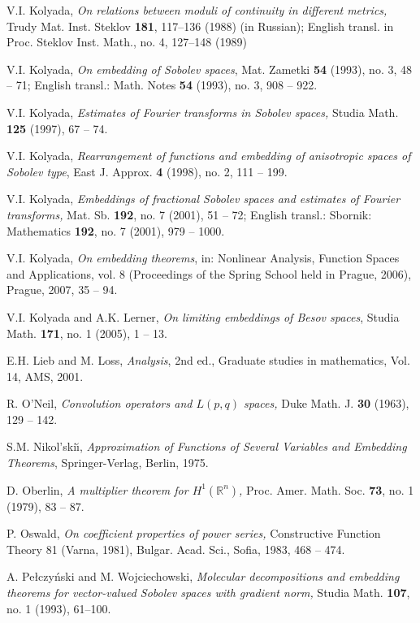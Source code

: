 \documentclass[12pt,twoside,reqno]{amsart}
\numberwithin{equation}{section}
\theoremstyle{definition}
\numberwithin{equation}{section}
\def\R{\mathbb{R}}
\begin{document}
\begin{thebibliography}{99}
  V.I. Kolyada, {\it On relations between moduli of
continuity in different metrics,} Trudy Mat. Inst. Steklov {\bf
181}, 117--136 (1988) (in Russian); English transl. in Proc.
Steklov Inst. Math., no. 4, 127--148 (1989)

 V.I. Kolyada,  {\it On embedding of Sobolev spaces}, Mat. Zametki {\bf 54}
 (1993), no. 3,  48 -- 71; English transl.:  Math. Notes {\bf 54}  (1993), no. 3, 908 --
 922.

  V.I. Kolyada,  {\it Estimates of Fourier
transforms in Sobolev spaces,} Studia Math. {\bf 125} (1997), 67
-- 74.

V.I. Kolyada, {\it Rearrangement of functions and embedding of
anisotropic spaces of Sobolev type}, East J. Approx. {\bf 4}
(1998), no. 2, 111 -- 199.

  V.I. Kolyada, {\it Embeddings of fractional Sobolev spaces and estimates of Fourier transforms,}
 Mat. Sb. {\bf 192}, no. 7 (2001), 51 -- 72; English transl.:  Sbornik:
 Mathematics {\bf 192}, no. 7 (2001), 979 -- 1000.


  V.I. Kolyada, {\it On embedding theorems}, in:
Nonlinear Analysis, Function Spaces and Applications, vol. 8 (Proceedings of the Spring School held in Prague, 2006), Prague, 2007, 35 -- 94.




V.I. Kolyada and A.K. Lerner, {\it On limiting embeddings of Besov
spaces}, Studia Math. {\bf 171}, no. 1 (2005), 1 -- 13.

 E.H. Lieb and M. Loss, {\it Analysis}, 2nd ed., Graduate studies in mathematics,
Vol. 14, AMS, 2001.

 R. O'Neil, {\it Convolution operators and $L(p,q)$
spaces,} Duke Math. J. {\bf 30} (1963), 129 -- 142.

 S.M. Nikol'ski\u{\i}, {\it Approximation of Functions of Several
Variables and Embedding Theorems}, Springer-Verlag, Berlin, 1975.

 D. Oberlin, {\it A multiplier theorem for $H^1(\R^n)$,} Proc. Amer. Math. Soc. {\bf 73}, no. 1 (1979), 83 -- 87.


 P. Oswald, {\it On coefficient properties of power series,} Constructive Function Theory 81 (Varna, 1981), Bulgar. Acad. Sci., Sofia, 1983, 468 -- 474.


 A. Pe\l czy\'nski and M. Wojciechowski,
{\it Molecular decompositions and embedding theorems for
vector-valued Sobolev spaces with gradient norm,} Studia Math.
{\bf 107}, no. 1 (1993), 61--100.


\end{thebibliography}
\end{document}
